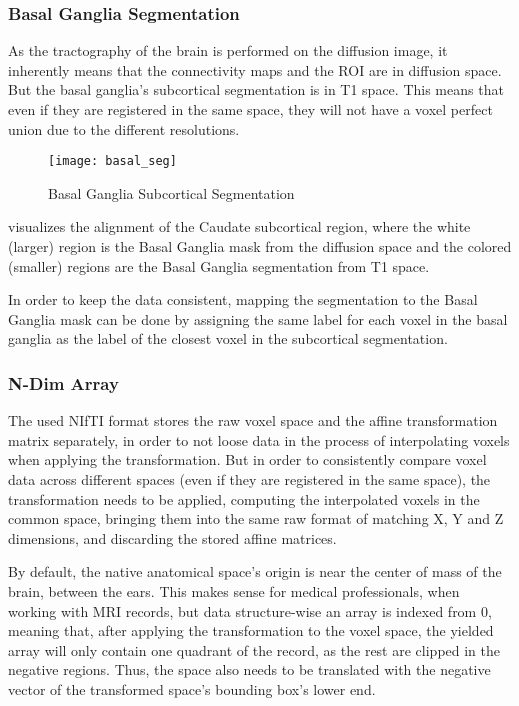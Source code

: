 \subsubsection{Basal Ganglia Segmentation}

As the tractography of the brain is performed on the diffusion image, it inherently means that the connectivity maps and the \ac{ROI} are in diffusion space. But the basal ganglia's subcortical segmentation is in T1 space. This means that even if they are registered in the same space, they will not have a voxel perfect union due to the different resolutions.

\begin{figure}[H]
\centering
\texttt{[image: basal\_seg]}
\caption{Basal Ganglia Subcortical Segmentation}
\label{fig:basal_seg}
\end{figure}

 visualizes the alignment of the Caudate subcortical region, where the white (larger) region is the Basal Ganglia mask from the diffusion space and the colored (smaller) regions are the Basal Ganglia segmentation from T1 space.\par

In order to keep the data consistent, mapping the segmentation to the Basal Ganglia mask can be done by assigning the same label for each voxel in the basal ganglia as the label of the closest voxel in the subcortical segmentation.

\subsubsection{N-Dim Array}
The used \ac{NIfTI} format stores the raw voxel space and the affine transformation matrix separately, in order to not loose data in the process of interpolating voxels when applying the transformation. But in order to consistently compare voxel data across different spaces (even if they are registered in the same space), the transformation needs to be applied, computing the interpolated voxels in the common space, bringing them into the same raw format of matching X, Y and Z dimensions, and discarding the stored affine matrices.\par

By default, the native anatomical space's origin is near the center of mass of the brain, between the ears. This makes sense for medical professionals, when working with \ac{MRI} records, but data structure-wise an array is indexed from 0, meaning that, after applying the transformation to the voxel space, the yielded array will only contain one quadrant of the record, as the rest are clipped in the negative regions. Thus, the space also needs to be translated with the negative vector of the transformed space's bounding box's lower end.\par

